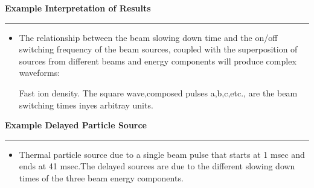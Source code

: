     \begin{slide}          \setlength{\topmargin}{-0.5 in}
       \begin{center}
           \Large\bfseries Example Interpretation of Results
        \bigskip
        \end{center}
        \hrule height4pt
         \begin{itemize} \bfseries \tiny
          \item The relationship between the beam slowing down time and
          the on/off switching frequency of the beam sources, coupled
          with the superposition of sources from different beams and
          energy components will produce complex
          waveforms:


        Fast ion density.
                 The square wave,composed pulses a,b,c,etc., are the
                 beam switching times inyes
                 arbitray units.
    \end{itemize}
    \end{slide} 
 
    \begin{slide}          \setlength{\topmargin}{0. in}
       \begin{center}
           \Large\bfseries Example Delayed Particle Source
        \bigskip
        \end{center}
        \hrule height4pt
         \begin{itemize} \bfseries \tiny
          \item


         Thermal  particle source due to a
          single beam pulse that starts at 1 msec and ends at 41
          msec.The delayed sources are due to the different slowing
          down times of the three beam energy components.
    \end{itemize}
    \end{slide}


